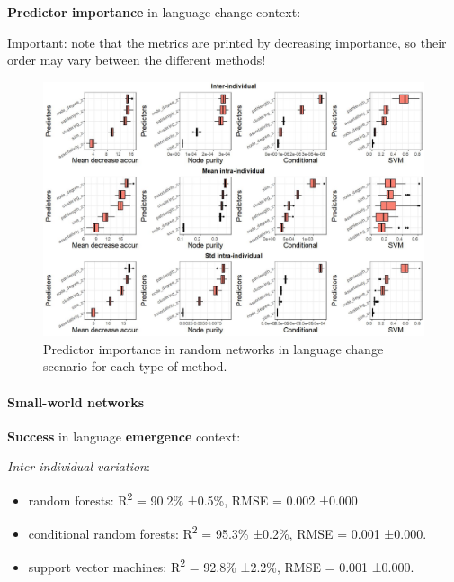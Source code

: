 \documentclass[
]{article}
\providecommand{\tightlist}{%
  \setlength{\itemsep}{0pt}\setlength{\parskip}{0pt}}
\begin{document}
\textbf{Predictor importance} in language change context:

Important: note that the metrics are printed by decreasing importance,
so their order may vary between the different methods!

\begin{figure}[!H]

{\centering \includegraphics{./Figures/unnamed-chunk-98-1} 

}

\caption{Predictor importance in random networks in language change scenario for each type of method.}\label{fig:unnamed-chunk-98}
\end{figure}

\hypertarget{small-world-networks}{%
\paragraph{Small-world networks}\label{small-world-networks}}

\textbf{Success} in language \textbf{emergence} context:

\emph{Inter-individual variation}:

\begin{itemize}
\tightlist
\item
  random forests: R\textsuperscript{2} = 90.2\% ±0.5\%, RMSE = 0.002
  ±0.000
\item
  conditional random forests: R\textsuperscript{2} = 95.3\% ±0.2\%, RMSE
  = 0.001 ±0.000.
\item
  support vector machines: R\textsuperscript{2} = 92.8\% ±2.2\%, RMSE =
  0.001 ±0.000.
\end{itemize}
\end{document}
